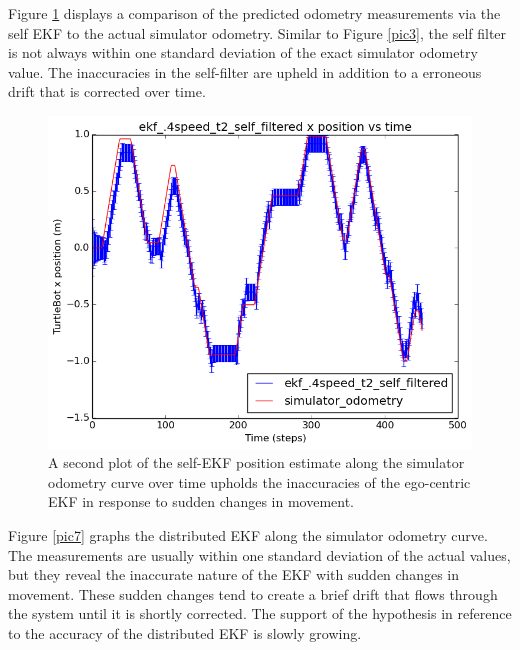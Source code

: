\documentclass[conference]{IEEEtran} \usepackage[T1]{fontenc} \usepackage[backend=biber, style=ieee]{biblatex}
\begin{document}
Figure \ref{pic6} displays a comparison of the predicted odometry measurements via the self EKF to the actual simulator 
odometry. Similar to Figure \ref{pic3}, the self filter is not always within one standard deviation of the exact simulator 
odometry value. The inaccuracies in the self-filter are upheld in addition to a erroneous drift that is corrected over 
time.

\begin{figure}
\centering 
\includegraphics[scale=.45]{ekf_4speed_t2_self_filtered_pos_err_graph}
\caption {A second plot of the self-EKF position estimate along the simulator odometry curve over time 
upholds the inaccuracies of the ego-centric EKF in response to sudden changes in movement.}
\label{pic6} 
\end{figure}

Figure \ref{pic7} graphs the distributed EKF along the simulator odometry curve. The measurements are usually within one standard 
deviation of the actual values, but they reveal the inaccurate nature of the EKF with sudden changes in movement. These 
sudden changes tend to create a brief drift that flows through the system until it is shortly corrected. The support of 
the hypothesis in reference to the accuracy of the distributed EKF is slowly growing.
\end{document}
